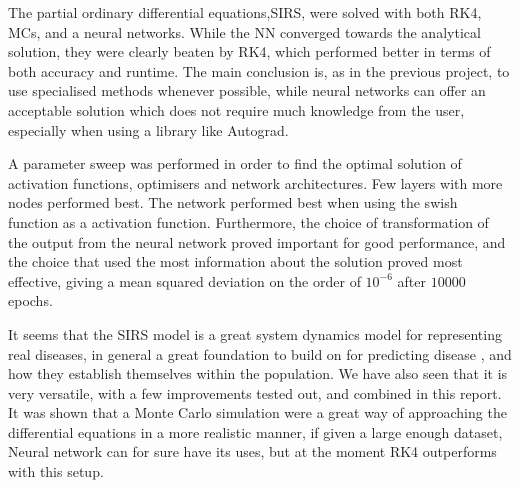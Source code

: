 

The partial ordinary differential equations,SIRS, were solved with both RK4, MCs, and a neural networks. While the NN converged towards the analytical solution, they were clearly beaten by RK4, which performed better in terms of both accuracy and runtime. The main conclusion is, as in the previous project, to use specialised methods whenever possible, while neural networks can offer an acceptable solution which does not require much knowledge from the user, especially when using a library like Autograd.

A parameter sweep was performed in order to find the optimal solution of activation functions, optimisers and network architectures. Few layers with more nodes performed best. The network performed best when using the swish function as a activation function. Furthermore, the choice of transformation of the output from the neural network proved important for good performance, and the choice that used the most information about the solution proved most effective, giving a mean squared deviation on the order of $10^{-6}$ after $10000$ epochs.


It seems that the SIRS model is a great system dynamics model for representing real diseases, in general a great foundation to build on for predicting disease , and how they establish themselves within the population. We have also seen that it is very versatile, with a few improvements tested out, and combined in this report. It was shown that a Monte Carlo simulation were a great way of approaching the differential equations in a more realistic manner, if given a large enough dataset, Neural network can for sure have its uses, but at the moment RK4 outperforms with this setup. 
